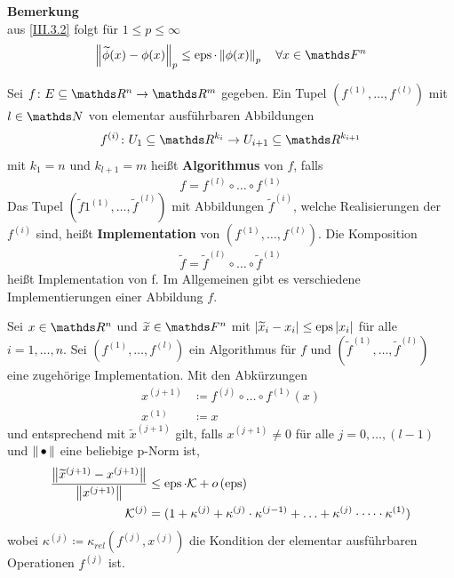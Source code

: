 \textbf{Bemerkung}\\
aus \eqref{III.3.2} folgt für $1\leq p\leq \infty$
\begin{gather}
  \nn[\widetilde{\phi}(x)-\phi(x)]_p \leq \Eps\cdot\nn[\phi(x)]_p
  \quad \forall x\in\F^n \label{III.3.3}
\end{gather}


\begin{Defe}\label{3.3.4}
  Sei $f\colon E\subseteq \Ren \to \R^m$ gegeben.
  Ein Tupel $\left(f^{(1)},\ldots ,f^{(l)}\right)$ 
  mit $l\in \N$ von elementar ausführbaren Abbildungen
  \begin{gather*}
    f^{(i)}\colon U_1\subseteq \R^{k_i} \to U_{i+1}\subseteq \R^{k_{i+1}}
  \end{gather*}
  mit $k_1=n$ und $k_{l+1}=m$ heißt 
  \textbf{Algorithmus} von $f$, falls
  \begin{gather*}
    f=f	^{(l)}\circ \dotsc \circ f^{(1)}
  \end{gather*}
  Das Tupel $(\widetilde{f}1^{(1)},\ldots ,\widetilde{f}^{(l)})$ mit Abbildungen $\widetilde{f}^{(i)}$, welche Realisierungen der $f^{(i)}$ sind,
  heißt \textbf{Implementation} von 
  $\left(f^{(1)},\dotsc ,f^{(l)}\right)$.
  Die Komposition 
  \begin{gather*}
    \widetilde{f}=\widetilde{f}	^{(l)}\circ \dotsc \circ \widetilde{f}^{(1)}
  \end{gather*}
  heißt Implementation von f.
  Im Allgemeinen gibt es verschiedene Implementierungen einer Abbildung $f$.
\end{Defe}


\begin{Leme}[Fehlerfortpflanzung]
  \label{3.3.5} 
  Sei $x\in \Ren$ und $\widetilde{x}\in \F^n$ mit $|\widetilde{x}_i-x_i|\leq \operatorname{eps}|x_i|$ für alle 
  $i=1,\ldots , n$.
  Sei $\left(f^{(1)},\dotsc ,f^{(l)}\right)$ ein Algorithmus für $f$ und 
  $(\widetilde{f}^{(1)},\dotsc ,\widetilde{f}^{(l)})$ 
  eine zugehörige Implementation.
  Mit den Abkürzungen
  \begin{align*}
    x^{(j+1)} &\coloneqq f^{(j)}\circ \dotsc \circ f^{(1)}(x) \\
    x^{(1)} &\coloneqq x
  \end{align*}
  und entsprechend mit $\widetilde{x}^{(j+1)}$ gilt,
  falls $x^{(j+1)} \neq 0$ für alle $j=0,\dotsc , (l-1)$ 
  und $\left\| \,\bullet\, \right\|$ eine beliebige p-Norm ist,
  \begin{align}
    \frac{\nn[\widetilde{x}^{(j+1)}-x^{(j+1)}]}{\nn[x^{(j+1)}]}
    &\leq \Eps \cdot \K + o\left(\Eps\right)
      \label{III.3.4} 
    \\ \nonumber
    \K^{(j)} &=(1+\kappa^{(j)}+\kappa^{(j)}\cdot \kappa^{(j-1)}
               + \ldots 
               + \kappa^{(j)}\cdot \dotsm \cdot \kappa^{(1)})
  \end{align}
  wobei $\kappa^{(j)} \coloneqq \kappa_{rel}(f^{(j)}, x^{(j)})$
  die Kondition der elementar ausführbaren Operationen $f^{(j)}$ ist.
\end{Leme}

